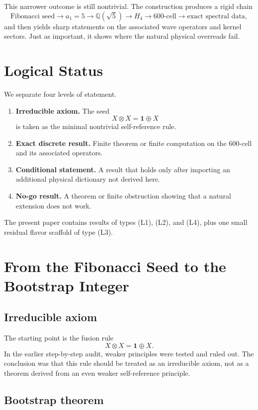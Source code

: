 \documentclass[12pt,a4paper]{article}
\theoremstyle{definition}
\begin{document}
This narrower outcome is still nontrivial. The construction produces a rigid
chain
\[
\text{Fibonacci seed} \to a_1=5 \to \mathbb{Q}(\sqrt{5}) \to H_4
\to \text{600-cell} \to \text{exact spectral data},
\]
and then yields sharp statements on the associated wave operators and kernel
sectors. Just as important, it shows where the natural physical overreads fail.

\section{Logical Status}

We separate four levels of statement.

\begin{enumerate}[label=\textup{(L\arabic*)}]
\item \textbf{Irreducible axiom.} The seed
  \[
  X \otimes X = \mathbf{1} \oplus X
  \]
  is taken as the minimal nontrivial self-reference rule.
\item \textbf{Exact discrete result.} Finite theorem or finite computation on
  the 600-cell and its associated operators.
\item \textbf{Conditional statement.} A result that holds only after importing
  an additional physical dictionary not derived here.
\item \textbf{No-go result.} A theorem or finite obstruction showing that a
  natural extension does not work.
\end{enumerate}

The present paper contains results of types (L1), (L2), and (L4), plus one
small residual flavor scaffold of type (L3).

\section{From the Fibonacci Seed to the Bootstrap Integer}

\subsection{Irreducible axiom}

The starting point is the fusion rule
\[
X \otimes X = \mathbf{1} \oplus X.
\]
In the earlier step-by-step audit, weaker principles were tested and ruled out.
The conclusion was that this rule should be treated as an irreducible axiom,
not as a theorem derived from an even weaker self-reference principle.

\subsection{Bootstrap theorem}
\end{document}
